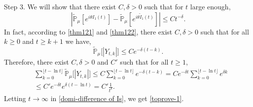 \documentclass[12pt,a4paper]{amsart}
\theoremstyle{plain}
\theoremstyle{definition}
\numberwithin{equation}{section}
\begin{document}
    Step 3. 
    We will show that there exist $C, \delta> 0$ such that for $t$ large enough,
\begin{equation}\label{domi-difference of Is}
    |\mathbb{\tilde{P}}_{\mu}[e^{i\theta I_1(t)}] - \mathbb{\tilde{P}}_{\mu}[e^{i\theta\tilde{I}_1(t)}]|
    \leq C t^{-\delta}.
\end{equation}
    In fact, according to \eqref{thm121} and \eqref{thm122}, there exist $C,\delta > 0$ such that
    for all $k \geq 0$ and $t\geq k+1$ we have,
\[
    \tilde{\mathbb P}_\mu\big[|Y_{t,k}|\big]
    \leq C e^{-\delta(t-k)}.
\]
    Therefore, there exist $C, \delta > 0$ and $C'$ such that for all $t \geq 1$,
\begin{equation}\begin{split}
    &\sum_{k=0}^{\lfloor t-\ln t \rfloor} \tilde {\mathbb P}_\mu\big[|Y_{t,k}|\big]
    \leq C\sum_{k=0}^{\lfloor t-\ln t \rfloor} e^{-\delta(t-k)}
    = C e^{-\delta t}\sum_{k=0}^{\lfloor t-\ln t \rfloor} e^{\delta k}
    \\&\leq C' e^{-\delta t}e^{\delta (t-\ln t)}
    = C'\frac{1}{t^{\delta}}.
\end{split}\end{equation}
    Letting $t\to\infty$ in \eqref{domi-difference of Is}, we get \eqref{toprove-1}.
\end{document}
